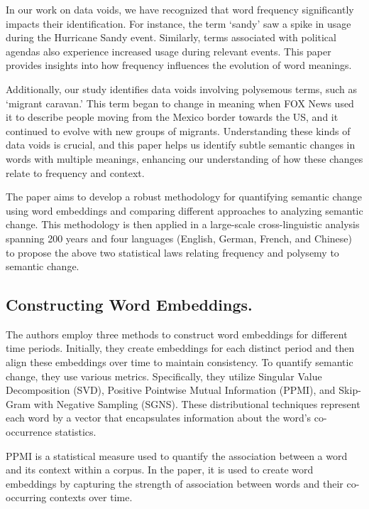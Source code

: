 In our work on data voids, we have recognized that word frequency significantly impacts their identification.
For instance, the term `sandy' saw a spike in usage during the Hurricane Sandy event.
Similarly, terms associated with political agendas also experience increased usage during relevant events.
This paper provides insights into how frequency influences the evolution of word meanings.

Additionally, our study identifies data voids involving polysemous terms, such as `migrant caravan.'
This term began to change in meaning when FOX News used it to describe people moving from the Mexico border towards the US, and it continued to evolve with new groups of migrants.
Understanding these kinds of data voids is crucial, and this paper helps us identify subtle semantic changes in words with multiple meanings,
enhancing our understanding of how these changes relate to frequency and context.

The paper aims to develop a robust methodology for quantifying semantic change using word embeddings and comparing different approaches to analyzing semantic change.
This methodology is then applied in a large-scale cross-linguistic analysis spanning 200 years and four languages
(English, German, French, and Chinese) to propose the above two statistical laws relating frequency and polysemy to semantic change.

\subsection{Constructing Word Embeddings.}\label{subsec:constructing-word-embeddings}
The authors employ three methods to construct word embeddings for different time periods.
Initially, they create embeddings for each distinct period and then align these embeddings over time to maintain consistency.
To quantify semantic change, they use various metrics.
Specifically, they utilize Singular Value Decomposition (SVD), Positive Pointwise Mutual Information (PPMI), and Skip-Gram with Negative Sampling (SGNS).
These distributional techniques represent each word by a vector that encapsulates information about the word’s co-occurrence statistics.

PPMI is a statistical measure used to quantify the association between a word and its context within a corpus.
In the paper, it is used to create word embeddings by capturing the strength of association between words and their co-occurring contexts over time.

